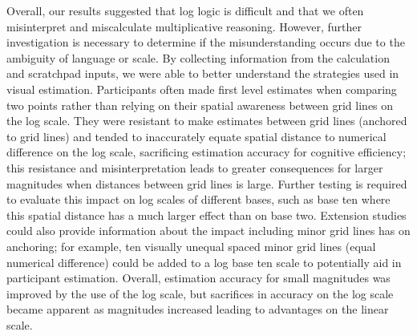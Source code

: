 \documentclass[print]{nuthesis}
\begin{document}
Overall, our results suggested that log logic is difficult and that we often misinterpret and miscalculate multiplicative reasoning.
However, further investigation is necessary to determine if the misunderstanding occurs due to the ambiguity of language or scale.
By collecting information from the calculation and scratchpad inputs, we were able to better understand the strategies used in visual estimation.
Participants often made first level estimates when comparing two points rather than relying on their spatial awareness between grid lines on the log scale.
They were resistant to make estimates between grid lines (anchored to grid lines) and tended to inaccurately equate spatial distance to numerical difference on the log scale, sacrificing estimation accuracy for cognitive efficiency; this resistance and misinterpretation leads to greater consequences for larger magnitudes when distances between grid lines is large.
Further testing is required to evaluate this impact on log scales of different bases, such as base ten where this spatial distance has a much larger effect than on base two.
Extension studies could also provide information about the impact including minor grid lines has on anchoring; for example, ten visually unequal spaced minor grid lines (equal numerical difference) could be added to a log base ten scale to potentially aid in participant estimation.
Overall, estimation accuracy for small magnitudes was improved by the use of the log scale, but sacrifices in accuracy on the log scale became apparent as magnitudes increased leading to advantages on the linear scale.
\end{document}
